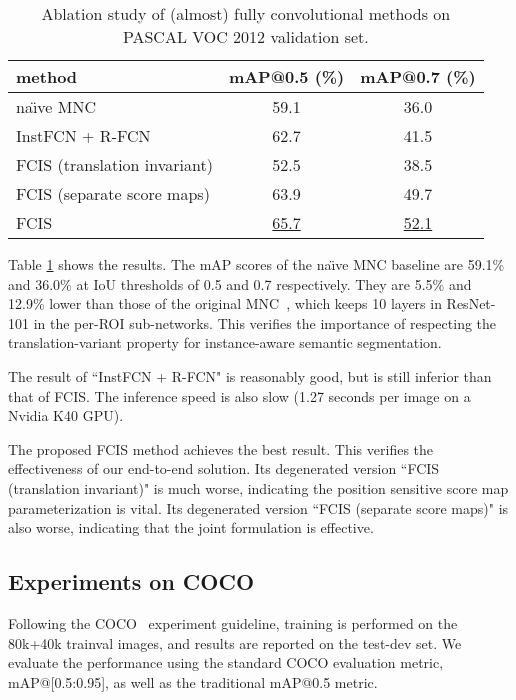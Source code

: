 \documentclass[10pt,twocolumn,letterpaper]{article}
\begin{document}
\setlength{\tabcolsep}{5pt}
\renewcommand{\arraystretch}{1.5}
\begin{table}
\begin{center}
\small
\begin{tabular}{l|c|c}
\hline
\footnotesize method & \scriptsize mAP@0.5 (\%) & \scriptsize mAP@0.7 (\%) \\
\hline
\hline
\footnotesize na\"{\i}ve MNC                      				 & 59.1 & 36.0 \\
\hline
\footnotesize InstFCN + R-FCN                                    & 62.7 & 41.5 \\
\hline
\footnotesize FCIS \scriptsize (translation invariant)    		 & 52.5 & 38.5 \\
\hline
\footnotesize FCIS \scriptsize (separate score maps)             & 63.9 & 49.7 \\
\hline
\footnotesize FCIS                                           & \underline{65.7} & \underline{52.1} \\
\hline
\end{tabular}
\end{center}
\caption{Ablation study of (almost) fully convolutional methods on PASCAL VOC 2012 validation set.}
\label{tab:ablation_voc}
\end{table}

Table \ref{tab:ablation_voc} shows the results. The  mAP scores of the na\"{\i}ve MNC baseline are 59.1\% and 36.0\% at IoU thresholds of 0.5 and 0.7 respectively. They are 5.5\% and 12.9\% lower than those of the original MNC~\cite{dai2016mnc}, which keeps 10 layers in ResNet-101 in the per-ROI sub-networks. This verifies the importance of respecting the translation-variant property for instance-aware semantic segmentation.

The result of ``InstFCN + R-FCN" is reasonably good, but is still inferior than that of FCIS. The inference speed is also slow (1.27 seconds per image on a Nvidia K40 GPU).

The proposed FCIS method achieves the best result. This verifies the effectiveness of our end-to-end solution. Its degenerated version ``FCIS (translation invariant)" is much worse, indicating the position sensitive score map parameterization is vital. Its degenerated version ``FCIS (separate score maps)" is also worse, indicating that the joint formulation is effective.

\subsection{Experiments on COCO}
Following the COCO~\cite{lin2014coco} experiment guideline, training is performed on the 80k+40k trainval images, and results are reported on the test-dev set. We evaluate the performance using the standard COCO evaluation metric, mAP@[0.5:0.95], as well as the traditional mAP@0.5 metric.
\end{document}
